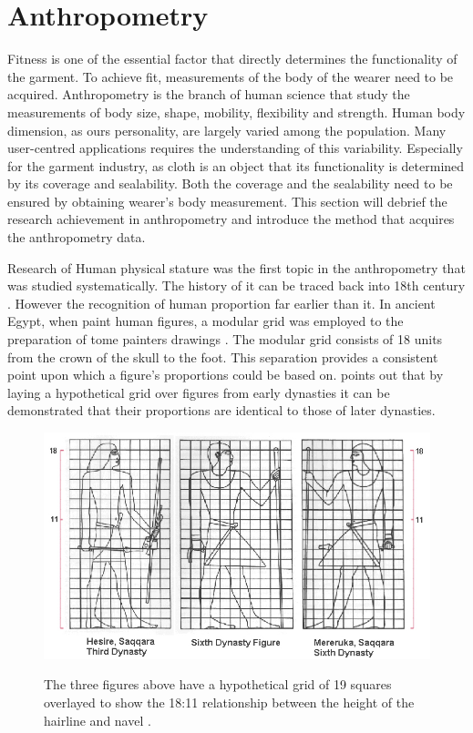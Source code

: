 \section{Anthropometry}

Fitness is one of the essential factor that directly determines the functionality of the garment. To achieve fit, measurements of the body of the wearer need to be acquired. Anthropometry is the branch of human science that study the measurements of body size, shape, mobility, flexibility and strength. Human body dimension, as ours personality, are largely varied among the population. Many user-centred applications requires the understanding of this variability. Especially for the garment industry, as cloth is an object that its functionality is determined by its coverage and sealability. Both the coverage and the sealability need to be ensured by obtaining wearer's body measurement. This section will debrief the research achievement in anthropometry and introduce the method that acquires the anthropometry data. 

Research of Human physical stature was the first topic in the anthropometry that was studied systematically. The history of it can be traced back into 18th century \cite{tanner_history_1981}. However the recognition of human proportion far earlier than it. 
In ancient Egypt, when paint human figures, a modular grid was employed to the preparation of tome painters drawings \cite{pheasant2006bodyspace}. The modular grid consists of 18 units from the crown of the skull to the foot. This separation provides a consistent point upon which a figure's proportions could be based on. \cite{robins1994proportion} points out that by laying a hypothetical grid over figures from early dynasties it can be demonstrated that their proportions are identical to those of later dynasties.  

\begin{figure}[ht]

    \centering
	\includegraphics[width=\columnwidth]{../images/threefigures}\\[1cm]
    \caption{The three figures above have a hypothetical grid of 19 squares overlayed 
to show the 18:11 relationship between the height of the hairline and navel \cite{robins1994proportion}.}
    \label{figure:fig1}
\end{figure}


